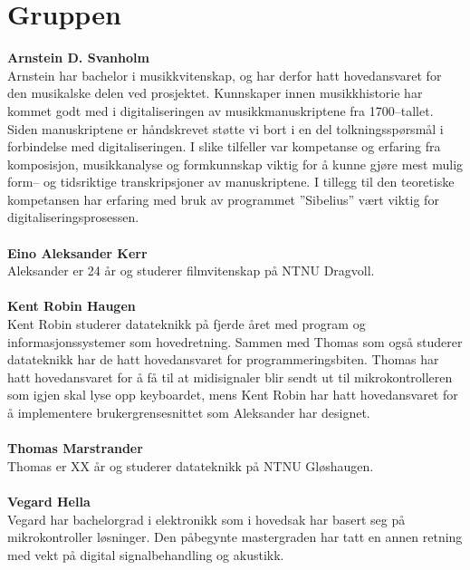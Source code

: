 \chapter{Gruppen}

\textbf{Arnstein D. Svanholm} \\
Arnstein har bachelor i musikkvitenskap, og har derfor hatt hovedansvaret for den musikalske delen ved prosjektet. Kunnskaper innen musikkhistorie har kommet godt med i digitaliseringen av musikkmanuskriptene fra 1700–tallet. Siden manuskriptene er håndskrevet støtte vi bort i en del tolkningsspørsmål i forbindelse med digitaliseringen. I slike tilfeller var kompetanse og erfaring fra komposisjon, musikkanalyse og formkunnskap viktig for å kunne gjøre mest mulig form– og tidsriktige transkripsjoner av manuskriptene. I tillegg til den teoretiske kompetansen har erfaring med bruk av programmet ”Sibelius” vært viktig for digitaliseringsprosessen.\\\\
\textbf{Eino Aleksander Kerr} \\
Aleksander er 24 år og studerer filmvitenskap på NTNU Dragvoll.\\\\
\textbf{Kent Robin Haugen} \\
Kent Robin studerer datateknikk på fjerde året med program og informasjonssystemer som hovedretning. Sammen med Thomas som også studerer datateknikk har de hatt hovedansvaret for programmeringsbiten. Thomas har hatt hovedansvaret for å få til at midisignaler blir sendt ut til mikrokontrolleren som igjen skal lyse opp keyboardet, mens Kent Robin har hatt hovedansvaret for å implementere brukergrensesnittet som Aleksander har designet. 
\\\\
\textbf{Thomas Marstrander} \\
Thomas er XX år og studerer datateknikk på NTNU Gløshaugen.\\\\
\textbf{Vegard Hella} \\
Vegard har bachelorgrad i elektronikk som i hovedsak har basert seg på mikrokontroller løsninger. Den påbegynte mastergraden har tatt en annen retning med vekt på digital signalbehandling og akustikk.\\
